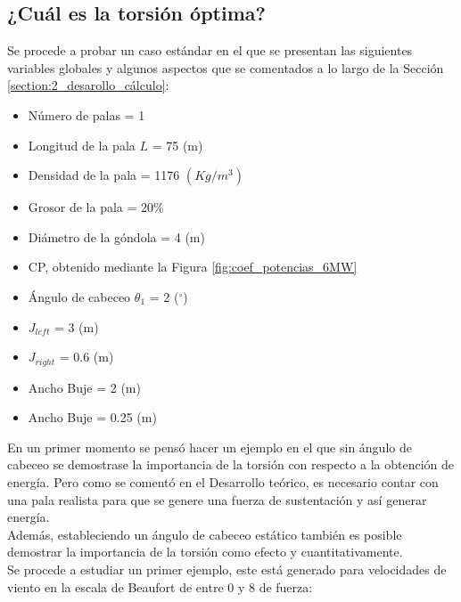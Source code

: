 \subsection{¿Cuál es la torsión óptima?}

Se procede a probar un caso estándar en el que se presentan las siguientes variables globales y algunos aspectos que se comentados a lo largo de la Sección \ref{section:2_desarollo_cálculo}: 

\begin{itemize}
  \item Número de palas = 1
  \item Longitud de la pala $L$ = 75 (m)
  \item Densidad de la pala = 1176 $(Kg/m^3)$
  \item Grosor de la pala = 20\%
  \item Diámetro de la góndola = 4 (m)
  \item CP, obtenido mediante la Figura \ref{fig:coef_potencias_6MW}
  \item Ángulo de cabeceo $\theta_1$ = 2 ($^{\circ}$)
  \item $J_{left}$ = 3 (m)
  \item $J_{right}$ = 0.6 (m)
  \item Ancho Buje = 2 (m)
  \item Ancho Buje = 0.25 (m)


\end{itemize}



En un primer momento se pensó hacer un ejemplo en el que sin ángulo de cabeceo se demostrase la importancia de la torsión con respecto a la obtención de energía. Pero como se comentó en el Desarrollo teórico, es necesario contar con una pala realista para que se genere una fuerza de sustentación y así generar energía. \\

Además, estableciendo un ángulo de cabeceo estático también es posible demostrar la importancia de la torsión como efecto y cuantitativamente.\\

Se procede a estudiar un primer ejemplo, este está generado para velocidades de viento en la escala de Beaufort de entre 0 y 8 de fuerza:

